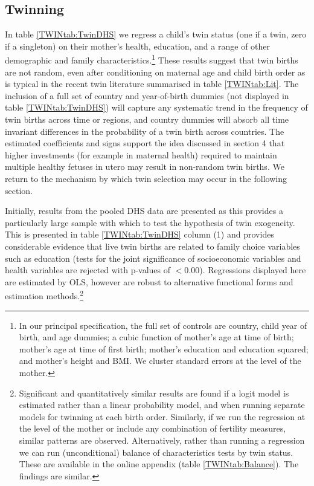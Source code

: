 \documentclass[subeqn]{article}
\begin{document}
\begin{spacing}{1.4}
\subsection{Twinning}                              \label{TWINsscn:twinning}
In table \ref{TWINtab:TwinDHS} we regress a child's twin status (one if a twin, 
zero if a singleton) on their mother's health, education, and a range of other 
demographic and family characteristics.\footnote{In our principal specification, 
the full set of controls are country, child year of birth, and age dummies; a 
cubic function of mother's age at time of birth; mother's age at time of first 
birth; mother's education and education squared; and mother's height and BMI. 
We cluster standard errors at the level of the mother.}  These results suggest
that twin births are not random, even after conditioning on maternal age and 
child birth order as is typical in the recent twin literature summarised in table
\ref{TWINtab:Lit}. The inclusion of a full set of country and year-of-birth
dummies (not displayed in table \ref{TWINtab:TwinDHS}) will capture any 
systematic trend in the frequency of twin births across time or regions, and 
country dummies will absorb all time invariant differences in the probability 
of a twin birth across countries. The estimated coefficients and signs support 
the idea discussed in section 4 that higher investments (for example in maternal 
health) required to maintain multiple healthy fetuses in utero may result in 
non-random twin births. We return to the mechanism by which twin selection may
occur in the following section.

Initially, results from the pooled DHS data are presented as this provides a 
particularly large sample with which to test the hypothesis of twin exogeneity. 
This is presented in table \ref{TWINtab:TwinDHS} column (1) and provides 
considerable evidence that live twin births are related to family choice 
variables such as education (tests for the joint significance of socioeconomic 
variables and health variables are rejected with p-values of $<$0.00).  
Regressions displayed here are estimated by OLS, however are robust to 
alternative functional forms and estimation methods.\footnote{Significant and 
quantitatively similar results are found if a logit model is estimated rather 
than a linear probability model, and when running separate models for twinning at 
each birth order. Similarly, if we run the regression at the level of the mother 
or include any combination of fertility measures, similar patterns are observed.
Alternatively, rather than running a regression we can run (unconditional) balance 
of characteristics tests by twin status.  These are available in the online 
appendix (table \ref{TWINtab:Balance}).  The findings are similar.}


\end{spacing}
\end{document}

